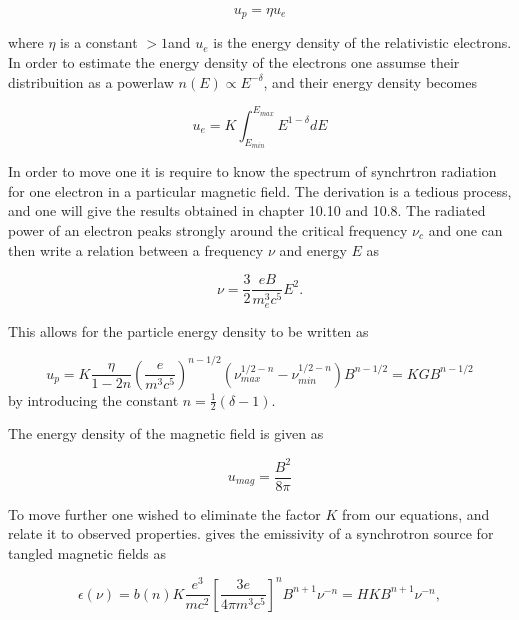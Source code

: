 \begin{equation}
    u_p = \eta u_e
\end{equation}

where $\eta$ is a constant $>1$and $u_e$ is the energy density of the relativistic electrons. In order to estimate the energy density of the electrons one assumse their distribuition as a powerlaw $n(E) \propto E^{-\delta}$, and their energy density becomes

\begin{equation}
    u_e = K \int_{E_{min}}^{E_{max}} E^{1-\delta} dE
\end{equation}

In order to move one it is require to know the spectrum of synchrtron radiation for one electron in a particular magnetic field. The derivation is a tedious process, and one will give the results obtained in \cite{2013Wilson} chapter 10.10 and 10.8. The radiated power of an electron peaks strongly around the critical frequency $\nu_c$ and one can then write a relation between a frequency $\nu$  and energy $E$ as 

\begin{equation}
    \nu = \frac{3}{2}\frac{eB}{m_e^3 c^5}E^2.
\end{equation}

This allows for the particle energy density to be written as 

\begin{equation}
    \label{eq:energy_density_particles}
    u_p = K \frac{\eta}{1-2n} \left(\frac{e}{m^3c^5}\right)^{n-1/2}\left(\nu_{max}^{1/2-n}-\nu_{min}^{1/2-n}\right) B^{n-1/2} = K G B^{n-1/2}
\end{equation}
by introducing the constant $n = \frac{1}{2}(\delta -1 )$. 

The energy density of the magnetic field is given as 

\begin{equation}
    u_{mag} = \frac{B^2}{8\pi}
\end{equation}

To move further one wished to eliminate the factor $K$ from our equations, and relate it to observed properties. \cite{2013Wilson} gives the emissivity of a synchrotron source for tangled magnetic fields as 

\begin{equation}
    \epsilon(\nu)  = b(n)K \frac{e^3}{m c^2}\left[\frac{3 e}{4 \pi m^3 c^5}\right]^{n} B^{n+1} \nu^{-n} = H K B^{n+1} \nu^{-n},
\end{equation}

